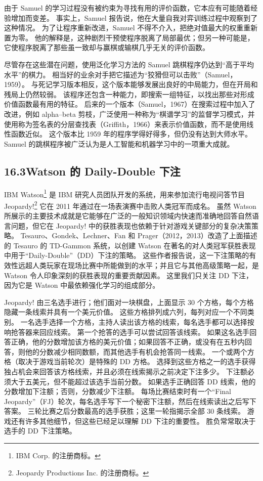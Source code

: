 \documentclass[UTF8, 12pt, fontset=fandol, oneside]{ctexart}
\begin{document}
由于 Samuel 的学习过程没有被约束为寻找有用的评价函数，它本应有可能随着经验增加而变差。
事实上，Samuel 报告说，他在大量自我对弈训练过程中观察到了这种情况。
为了让程序重新改进，Samuel 不得不介入，把绝对值最大的权重重新置为零。
他的解释是，这种剧烈干预使程序脱离了局部最优；但另一种可能是，它使程序脱离了那些虽一致却与赢棋或输棋几乎无关的评价函数。

尽管存在这些潜在问题，使用泛化学习方法的 Samuel 跳棋程序仍达到“高于平均水平”的棋力。
相当好的业余对手把它描述为“狡猾但可以击败”（Samuel，1959）。
与死记学习版本相反，这个版本能够发展出良好的中局能力，但在开局和残局上仍然较弱。
该程序还包含一种能力，即搜索一组特征，以找出那些对形成价值函数最有用的特征。
后来的一个版本（Samuel，1967）在搜索过程中加入了改进，例如 alpha--beta 剪枝，广泛使用一种称为“棋谱学习”的监督学习模式，并使用称为签名表的分层查找表（Griffith，1966）来表示价值函数，而不是使用线性函数近似。
这个版本比 1959 年的程序学得好得多，但仍没有达到大师水平。
Samuel 的跳棋程序被广泛认为是人工智能和机器学习中的一项重大成就。

\subsection*{16.3\quad Watson 的 Daily-Double 下注}

IBM Watson\footnote{IBM Corp. 的注册商标。} 是 IBM 研究人员团队开发的系统，用来参加流行电视问答节目 Jeopardy!\footnote{Jeopardy Productions Inc. 的注册商标。}
它在 2011 年通过在一场表演赛中击败人类冠军而成名。
虽然 Watson 所展示的主要技术成就是它能够在广泛的一般知识领域内快速而准确地回答自然语言问题，但它在 Jeopardy! 中的获胜表现也依赖于针对游戏关键部分的复杂决策策略。
Tesauro、Gondek、Lechner、Fan 和 Prager（2012，2013）改造了上面描述的 Tesauro 的 TD-Gammon 系统，以创建 Watson 在著名的对人类冠军获胜表现中用于“Daily-Double”（DD）下注的策略。
这些作者报告说，这一下注策略的有效性远超人类玩家在现场比赛中所能做到的水平；并且它与其他高级策略一起，是 Watson 令人印象深刻的获胜表现的重要贡献因素。
这里我们只关注 DD 下注，因为它是 Watson 中最依赖强化学习的组成部分。

Jeopardy! 由三名选手进行；他们面对一块棋盘，上面显示 30 个方格，每个方格隐藏一条线索并具有一个美元价值。
这些方格排列成六列，每列对应一个不同类别。
一名选手选择一个方格，主持人读出该方格的线索，每名选手都可以选择按响抢答器来回应线索。
第一个抢答的选手可以尝试回答该线索。
如果这名选手回答正确，他的分数增加该方格的美元价值；如果回答不正确，或没有在五秒内回答，则他的分数减少相同数额，而其他选手有机会抢答同一线索。
一个或两个方格（取决于游戏当前轮次）是特殊的 DD 方格。
选择到这些方格之一的选手获得独占机会来回答该方格线索，并且必须在线索揭示之前决定下注多少。
下注额必须大于五美元，但不能超过该选手当前分数。
如果选手正确回答 DD 线索，他的分数增加下注额；否则，分数减少下注额。
每场比赛结束时有一个“Final Jeopardy”（FJ）轮次，每名选手写下一个秘密下注额，然后在线索读出之后写下答案。
三轮比赛之后分数最高的选手获胜；这里一轮指揭示全部 30 条线索。
游戏还有许多其他细节，但这些已经足以理解 DD 下注的重要性。
胜负常常取决于选手的 DD 下注策略。
\end{document}
